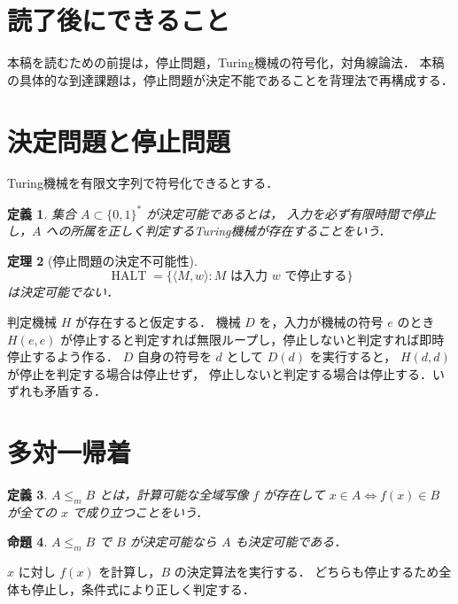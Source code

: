 \documentclass[a5paper,10pt,onecolumn]{jsarticle}
\makeatletter
\theoremstyle{mathnotetheorem}
\newtheorem{theorem}{定理}[section]
\newtheorem{definition}[theorem]{定義}
\newtheorem{proposition}[theorem]{命題}
\renewcommand{\proofname}{証明}
\renewenvironment{proof}[1][\proofname]{%
  \par\pushQED{\qed}\normalfont\topsep4\p@\@plus2\p@\relax
  \trivlist\item[\hskip\labelsep\bfseries #1]\ignorespaces
}{\popQED\endtrivlist\@endpefalse}
\makeatother
\begin{document}
\section*{読了後にできること}
本稿を読むための前提は，停止問題，Turing機械の符号化，対角線論法．
本稿の具体的な到達課題は，停止問題が決定不能であることを背理法で再構成する．

\section{決定問題と停止問題}
Turing機械を有限文字列で符号化できるとする．
\begin{definition}
集合 $A\subset\{0,1\}^*$ が決定可能であるとは，
入力を必ず有限時間で停止し，$A$ への所属を正しく判定するTuring機械が存在することをいう．
\end{definition}
\begin{theorem}[停止問題の決定不可能性]
\[
 \operatorname{HALT}=\{\langle M,w\rangle:M\text{ は入力 }w\text{ で停止する}\}
\]
は決定可能でない．
\end{theorem}
\begin{proof}
判定機械 $H$ が存在すると仮定する．
機械 $D$ を，入力が機械の符号 $e$ のとき
$H(e,e)$ が停止すると判定すれば無限ループし，停止しないと判定すれば即時停止するよう作る．
$D$ 自身の符号を $d$ として $D(d)$ を実行すると，
$H(d,d)$ が停止を判定する場合は停止せず，
停止しないと判定する場合は停止する．いずれも矛盾する．
\end{proof}
\section{多対一帰着}
\begin{definition}
$A\le_m B$ とは，計算可能な全域写像 $f$ が存在して
$x\in A\iff f(x)\in B$ が全ての $x$ で成り立つことをいう．
\end{definition}
\begin{proposition}
$A\le_m B$ で $B$ が決定可能なら $A$ も決定可能である．
\end{proposition}
\begin{proof}
$x$ に対し $f(x)$ を計算し，$B$ の決定算法を実行する．
どちらも停止するため全体も停止し，条件式により正しく判定する．
\end{proof}
\end{document}
